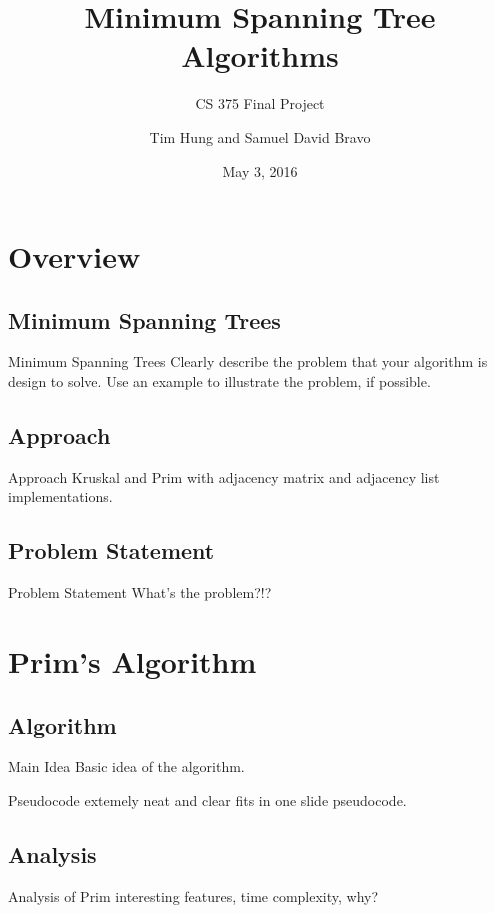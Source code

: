 \documentclass{beamer}
\title{Minimum Spanning Tree Algorithms}
\subtitle{CS 375 Final Project}
\author{Tim Hung and Samuel David Bravo}
\institute{Binghamton University}
\date{May 3, 2016}
\begin{document}
\frame{\titlepage}
\section{Overview}\frame{\sectionpage}

\subsection{Minimum Spanning Trees}
\begin{frame}{Minimum Spanning Trees}
    Clearly describe the problem that your algorithm is design to solve. Use an
    example to illustrate the problem, if possible.
\end{frame}

\subsection{Approach}
\begin{frame}{Approach}
    Kruskal and Prim with adjacency matrix and adjacency list implementations.
\end{frame}

\subsection{Problem Statement}
\begin{frame}{Problem Statement}
    What's the problem?!?
\end{frame}


\section{Prim's Algorithm}\frame{\sectionpage}
\subsection{Algorithm}
\begin{frame}{Main Idea}
    Basic idea of the algorithm.
\end{frame}

\begin{frame}{Pseudocode}
    extemely neat and clear fits in one slide pseudocode.
\end{frame}

\subsection{Analysis}
\begin{frame}{Analysis of Prim}
    interesting features, time complexity, why?
\end{frame}
\end{document}
